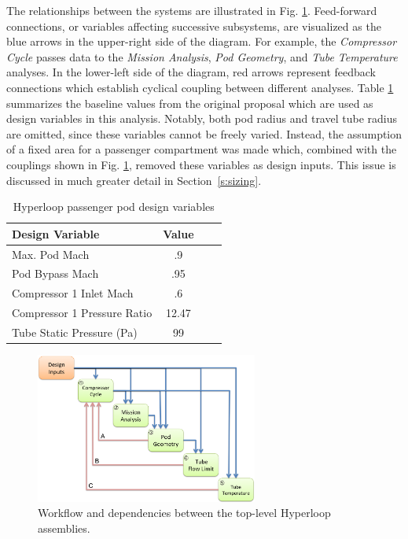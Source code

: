 \documentclass[heading.tex]{subfiles}
\begin{document}
The relationships between the systems are illustrated in Fig. \ref{f:hyperloopXDSM}. 
Feed-forward connections, or variables affecting successive subsystems,
are visualized as the blue arrows in the upper-right side of the diagram.
For example, the \textit{Compressor Cycle} passes data to the \textit{Mission Analysis},
\textit{Pod Geometry}, and \textit{Tube Temperature} analyses.
In the lower-left side of the diagram, red arrows represent feedback connections which establish cyclical coupling between different analyses.
Table \ref{tab:desvars} summarizes the baseline values from the original proposal which are used as design variables in this analysis.
Notably, both pod radius and travel tube radius are omitted, since these variables cannot be freely varied.
Instead, the assumption of a fixed area for a passenger compartment was made which,
combined with the couplings shown in Fig. \ref{f:hyperloopXDSM}, removed these variables as design inputs.
This issue is discussed in much greater detail in Section~\ref{s:sizing}.

\begin{table}
    \centering
    \caption{Hyperloop passenger pod design variables}
    \label{tab:desvars}
    \begin{tabular}{l  c  c  c} 
        \hline \hline
        Design Variable &  Value\\ \hline \hline
        Max. Pod Mach & .9 \\ 
        Pod Bypass Mach & .95\\
        Compressor 1 Inlet Mach & .6\\ 
        Compressor 1 Pressure Ratio & 12.47\\ 
        Tube Static Pressure (Pa) & 99 \\ \hline
    \end{tabular}
\end{table}

\begin{figure}[hbtp]
\centering
\includegraphics[width=0.65\textwidth]{images/TopAssembly.png}
\caption{Workflow and dependencies between the top-level Hyperloop assemblies.}
\label{f:hyperloopXDSM}
\end{figure}
\end{document}
